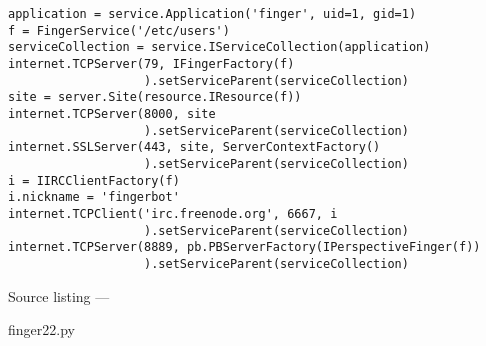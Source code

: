 \begin{verbatim}
application = service.Application('finger', uid=1, gid=1)
f = FingerService('/etc/users')
serviceCollection = service.IServiceCollection(application)
internet.TCPServer(79, IFingerFactory(f)
                   ).setServiceParent(serviceCollection)
site = server.Site(resource.IResource(f))
internet.TCPServer(8000, site
                   ).setServiceParent(serviceCollection)
internet.SSLServer(443, site, ServerContextFactory()
                   ).setServiceParent(serviceCollection)
i = IIRCClientFactory(f)
i.nickname = 'fingerbot'
internet.TCPClient('irc.freenode.org', 6667, i
                   ).setServiceParent(serviceCollection)
internet.TCPServer(8889, pb.PBServerFactory(IPerspectiveFinger(f))
                   ).setServiceParent(serviceCollection)
\end{verbatim}\parbox[b]{\linewidth}{\begin{center}Source listing --- \begin{em}finger22.py\end{em}\end{center}}